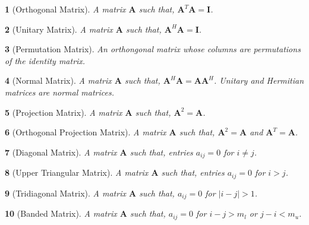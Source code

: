 \documentclass{article}
\theoremstyle{bolddef}
\newtheorem*{definition}{}
\begin{document}
\begin{definition}[Orthogonal Matrix]
    A matrix $\mathbf{A}$ such that, $\mathbf{A}^{T} \mathbf{A} = \mathbf{I}$.
\end{definition}

\begin{definition}[Unitary Matrix]
    A matrix $\mathbf{A}$ such that, $\mathbf{A}^{H} \mathbf{A} = \mathbf{I}$.
\end{definition}

\begin{definition}[Permutation Matrix]
    An orthongonal matrix whose columns are permutations of the identity matrix.
\end{definition}

\begin{definition}[Normal Matrix]
    A matrix $\mathbf{A}$ such that, $\mathbf{A}^{H} \mathbf{A} = \mathbf{A} \mathbf{A}^{H}$. Unitary and Hermitian
    matrices are normal matrices.
\end{definition}

\begin{definition}[Projection Matrix]
    A matrix $\mathbf{A}$ such that, $\mathbf{A}^{2} = \mathbf{A}$.
\end{definition}

\begin{definition}[Orthogonal Projection Matrix]
    A matrix $\mathbf{A}$ such that, $\mathbf{A}^{2} = \mathbf{A}$ and $\mathbf{A}^{T} = \mathbf{A}$.
\end{definition}

\begin{definition}[Diagonal Matrix]
    A matrix $\mathbf{A}$ such that, entries $a_{ij} = 0$ for $i \neq j$.
\end{definition}

\begin{definition}[Upper Triangular Matrix]
    A matrix $\mathbf{A}$ such that, entries $a_{ij} = 0$ for $i > j$.
\end{definition}

\begin{definition}[Tridiagonal Matrix]
    A matrix $\mathbf{A}$ such that, $a_{ij} = 0$ for $\left\lvert i - j \right\rvert > 1$.
\end{definition}

\begin{definition}[Banded Matrix]
    A matrix $\mathbf{A}$ such that, $a_{ij} = 0$ for $i - j > m_l$ or $j - i < m_u$.
\end{definition}
\end{document}
